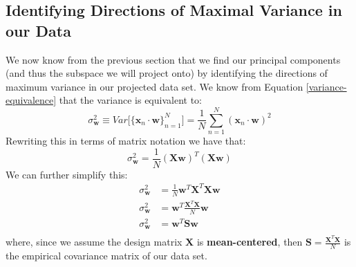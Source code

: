 \subsection{Identifying Directions of Maximal Variance in our Data}
We now know from the previous section that we find our principal components (and thus the subspace we will project onto) by identifying the directions of maximum variance in our projected data set. We know from Equation \ref{variance-equivalence} that the variance is equivalent to:
\begin{equation*}
    \sigma^{2}_{\textbf{w}} \equiv Var\big[\{\textbf{x}_{n} \cdot \textbf{w}\}_{n=1}^{N}\big] = \frac{1}{N} \sum_{n=1}^{N} (\textbf{x}_{n} \cdot \textbf{w})^{2}
\end{equation*}
Rewriting this in terms of matrix notation we have that:
\begin{equation*}
    \sigma^{2}_{\textbf{w}} = \frac{1}{N} (\textbf{X} \textbf{w})^{T} (\textbf{X} \textbf{w})
\end{equation*}
We can further simplify this:
\begin{align*}
    \sigma^{2}_{\textbf{w}} &= \frac{1}{N} \textbf{w}^{T}\textbf{X}^{T} \textbf{X} \textbf{w} \\
    \sigma^{2}_{\textbf{w}} &= \textbf{w}^{T} \frac{\textbf{X}^{T}\textbf{X}}{N} \textbf{w} \\
    \sigma^{2}_{\textbf{w}} &= \textbf{w}^{T} \textbf{S} \textbf{w} \\
\end{align*}
where, since we assume the design matrix $\mathbf{X}$ is {\bf mean-centered}, then  $\textbf{S} = \frac{\textbf{X}^{T}\textbf{X}}{N}$ is the empirical covariance matrix of our data set.



